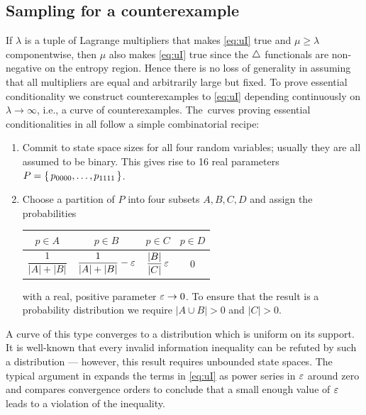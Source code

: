 \documentclass[11pt, a4paper]{tboege-preprint}
\begin{document}
\subsection{Sampling for a counterexample}

If $\lambda$ is a tuple of Lagrange multipliers that makes \eqref{eq:uI}
true and $\mu \ge \lambda$ componentwise, then $\mu$ also makes \eqref{eq:uI}
true since the $\triangle$ functionals are non-negative on the entropy region.
Hence there is no loss of generality in assuming that all multipliers are
equal and arbitrarily large but fixed. To prove essential conditionality
we construct counterexamples to \eqref{eq:uI} depending continuously on
$\lambda \to \infty$, i.e., a curve of counterexamples.
%
The~curves proving essential conditionalities in \cite{CondInfo} all
follow a simple combinatorial recipe:
\begin{enumerate}[label=\arabic*., leftmargin=3em, rightmargin=3em]
\item Commit to state space sizes for all four random variables;
  usually they are all assumed to be binary. This gives rise to
  16 real parameters $P = \left\{\, p_{0000}, \dots, p_{1111} \,\right\}$.
\item Choose a partition of $P$ into four subsets $A, B, C, D$ and
  assign the probabilities
  \begin{center}
  \setlength\tabcolsep{2em}
  \begin{tabular}{c|c|c|c}
    $p \in A$          &    $p \in B$                 &    $p \in C$                  & $p \in D$ \\[1ex] \hline \rule[-2ex]{0pt}{6.5ex}
    $\dfrac1{|A|+|B|}$ & \; $\dfrac1{|A|+|B|} - \varepsilon$ & \; $\dfrac{|B|}{|C|} \, \varepsilon$ & $0$
  \end{tabular}
  \end{center}
  with a real, positive parameter $\varepsilon \to 0$. To ensure that the
  result is a probability distribution we require $|A\cup B| > 0$
  and $|C| > 0$.
\end{enumerate}
A curve of this type converges to a distribution which is uniform on
its support. It is well-known \cite{Quasiunif} that every invalid
information inequality can be refuted by such a distribution --- however,
this result requires unbounded state spaces. The typical argument in
\cite{CondInfo} expands the terms in \eqref{eq:uI} as power series in
$\varepsilon$ around zero and compares convergence orders to conclude that a
small enough value of $\varepsilon$ leads to a violation of the inequality.
\end{document}
